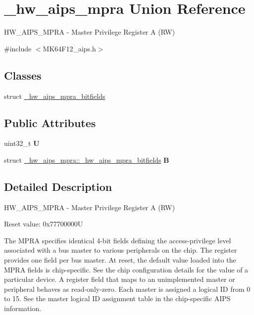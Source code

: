 \hypertarget{union__hw__aips__mpra}{}\section{\+\_\+hw\+\_\+aips\+\_\+mpra Union Reference}
\label{union__hw__aips__mpra}


H\+W\+\_\+\+A\+I\+P\+S\+\_\+\+M\+P\+RA -\/ Master Privilege Register A (RW)  




{\ttfamily \#include $<$M\+K64\+F12\+\_\+aips.\+h$>$}

\subsection*{Classes}
\begin{DoxyCompactItemize}
\item 
struct \hyperlink{struct__hw__aips__mpra_1_1__hw__aips__mpra__bitfields}{\+\_\+hw\+\_\+aips\+\_\+mpra\+\_\+bitfields}
\end{DoxyCompactItemize}
\subsection*{Public Attributes}
\begin{DoxyCompactItemize}
\item 
uint32\+\_\+t {\bfseries U}\hypertarget{union__hw__aips__mpra_a26437eeb1e7805e654754ba07abc28b5}{}\label{union__hw__aips__mpra_a26437eeb1e7805e654754ba07abc28b5}

\item 
struct \hyperlink{struct__hw__aips__mpra_1_1__hw__aips__mpra__bitfields}{\+\_\+hw\+\_\+aips\+\_\+mpra\+::\+\_\+hw\+\_\+aips\+\_\+mpra\+\_\+bitfields} {\bfseries B}\hypertarget{union__hw__aips__mpra_ad82e53b428d697a7ff42c14d38054de8}{}\label{union__hw__aips__mpra_ad82e53b428d697a7ff42c14d38054de8}

\end{DoxyCompactItemize}


\subsection{Detailed Description}
H\+W\+\_\+\+A\+I\+P\+S\+\_\+\+M\+P\+RA -\/ Master Privilege Register A (RW) 

Reset value\+: 0x77700000U

The M\+P\+RA specifies identical 4-\/bit fields defining the access-\/privilege level associated with a bus master to various peripherals on the chip. The register provides one field per bus master. At reset, the default value loaded into the M\+P\+RA fields is chip-\/specific. See the chip configuration details for the value of a particular device. A register field that maps to an unimplemented master or peripheral behaves as read-\/only-\/zero. Each master is assigned a logical ID from 0 to 15. See the master logical ID assignment table in the chip-\/specific A\+I\+PS information. 


